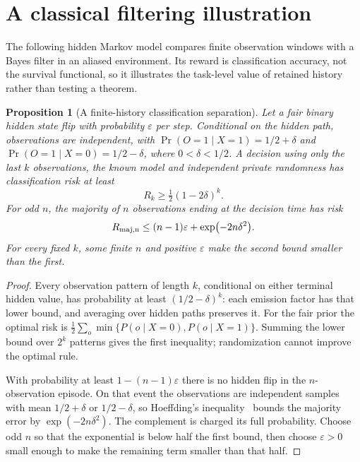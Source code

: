\documentclass[12pt]{article}
\newtheorem{proposition}[theorem]{Proposition}
\begin{document}
\section{A classical filtering illustration}
\label{sec:numerical}

The following hidden Markov model compares finite observation windows with a Bayes filter in an aliased environment. Its reward is classification accuracy, not the survival functional, so it illustrates the task-level value of retained history rather than testing a theorem.

\begin{proposition}[A finite-history classification separation]
\label{prop:history_separation}
Let a fair binary hidden state flip with probability $\varepsilon$ per step. Conditional on the hidden path, observations are independent, with
$\Pr(O=1\mid X=1)=1/2+\delta$ and
$\Pr(O=1\mid X=0)=1/2-\delta$, where $0<\delta<1/2$.
A decision using only the last $k$ observations, the known model and independent private randomness has classification risk at least
\[
 R_k\ge \tfrac12(1-2\delta)^k.
\]
For odd $n$, the majority of $n$ observations ending at the decision time has risk
\[
 R_{\rm maj,n}\le(n-1)\varepsilon+\exp(-2n\delta^2).
\]
For every fixed $k$, some finite $n$ and positive $\varepsilon$ make the second bound smaller than the first.
\end{proposition}

\begin{proof}
Every observation pattern of length $k$, conditional on either terminal hidden value, has probability at least $(1/2-\delta)^k$: each emission factor has that lower bound, and averaging over hidden paths preserves it. For the fair prior the optimal risk is
$\frac12\sum_o\min\{P(o\mid X=0),P(o\mid X=1)\}$.
Summing the lower bound over $2^k$ patterns gives the first inequality; randomization cannot improve the optimal rule.

With probability at least $1-(n-1)\varepsilon$ there is no hidden flip in the $n$-observation episode. On that event the observations are independent samples with mean $1/2+\delta$ or $1/2-\delta$, so Hoeffding's inequality~\cite{Hoeffding1963} bounds the majority error by $\exp(-2n\delta^2)$. The complement is charged its full probability. Choose odd $n$ so that the exponential is below half the first bound, then choose $\varepsilon>0$ small enough to make the remaining term smaller than that half.
\end{proof}
\end{document}

